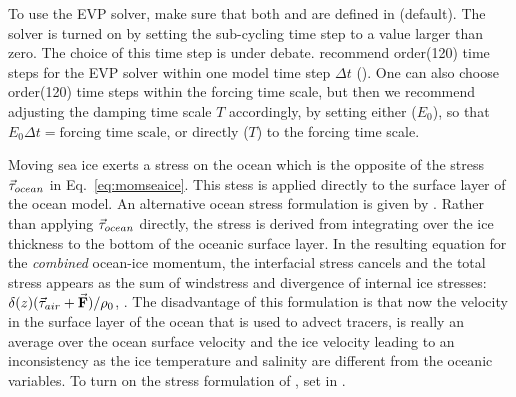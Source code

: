 To use the EVP solver, make sure that both  and
 are defined in 
(default). The solver is turned on by setting the sub-cycling time
step  to a value larger than zero. The
choice of this time step is under debate. \citet{hun97} recommend
order(120) time steps for the EVP solver within one model time step
$\Delta{t}$ (). One can also choose order(120) time
steps within the forcing time scale, but then we recommend adjusting
the damping time scale $T$ accordingly, by setting either
 ($E_{0}$), so that
$E_{0}\Delta{t}=\mbox{forcing time scale}$, or directly
 ($T$) to the forcing time scale.

Moving sea ice exerts a stress on the ocean which is the opposite of
the stress $\vec{\mathbf{\mathbf{\tau}}}_{ocean}$ in Eq.~\ref{eq:momseaice}. This stess is
applied directly to the surface layer of the ocean model. An
alternative ocean stress formulation is given by \citet{hibler87}.
Rather than applying $\vec{\mathbf{\mathbf{\tau}}}_{ocean}$ directly, the stress is derived
from integrating over the ice thickness to the bottom of the oceanic
surface layer. In the resulting equation for the \emph{combined}
ocean-ice momentum, the interfacial stress cancels and the total
stress appears as the sum of windstress and divergence of internal ice
stresses: $\delta(z) (\vec{\mathbf{\mathbf{\tau}}}_{air} + \vec{\mathbf{F}})/\rho_0$, \citep[see also
Eq.\,2 of][]{hibler87}. The disadvantage of this formulation is that
now the velocity in the surface layer of the ocean that is used to
advect tracers, is really an average over the ocean surface
velocity and the ice velocity leading to an inconsistency as the ice
temperature and salinity are different from the oceanic variables.
To turn on the stress formulation of \citet{hibler87}, set
 in .



